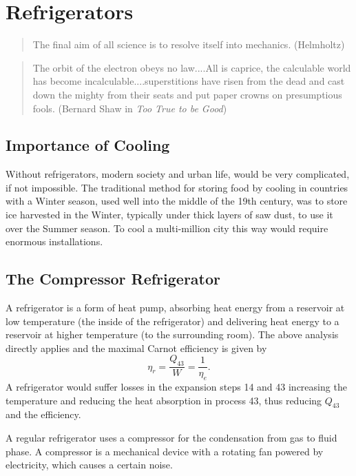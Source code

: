 \chapter{Refrigerators}

\small
\begin{quote} The final aim of all science is to resolve itself
into mechanics. (Helmholtz)
\end{quote}
\begin{quote} The orbit of the electron obeys no law....All is caprice,
the calculable world has become incalculable....superstitions have
risen from the dead and cast down the mighty from their seats and put
paper crowns on presumptious fools. (Bernard Shaw in 
\emph{Too True to be Good})
\end{quote}
\normalsize

\section{Importance of Cooling}

Without refrigerators, modern society and urban life, would be
very complicated, if not impossible. The traditional method 
for storing food by cooling in countries with a Winter season, used
well into the middle of the 19th century,
was to store ice harvested in the Winter, typically
under thick layers of saw dust, to use it over the Summer season.
To cool a multi-million city this way would require enormous
installations. 

\section{The Compressor Refrigerator}

A refrigerator is a form of heat pump, absorbing heat energy from
a reservoir at low temperature (the inside of the refrigerator)
and delivering heat energy to a reservoir at higher 
temperature (to the surrounding
room). The above analysis directly applies and the maximal Carnot efficiency 
is given by
\begin{equation}\label{efficiencyref}
\eta_{r} =\frac{Q_{43}}{W}=\frac{1}{\eta_{e}}.
\end{equation}
A refrigerator would suffer losses in the expansion steps 14 and 43 
increasing the temperature and reducing the heat absorption 
in process  43, thus reducing $Q_{43}$ and the efficiency. 

A regular refrigerator uses a compressor for the condensation
from gas to fluid phase. A compressor is a mechanical device with
a rotating fan powered by electricity, which causes a certain noise.

